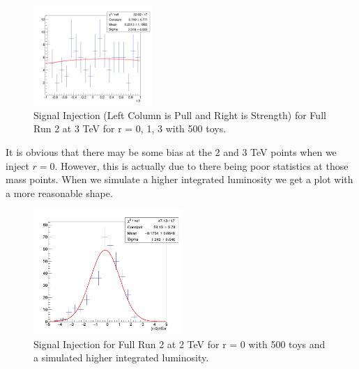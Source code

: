 \begin{figure}[!htb]
	\includegraphics[width=0.4\textwidth]{Figures/signalInjection3_500_sigstrength_3000.png}
	\caption{Signal Injection (Left Column is Pull and Right is Strength) for Full Run 2 at 3 TeV for r = 0, 1, 3 with 500 toys.}
	\label{fig:signalInjection3000plot}
\end{figure}
It is obvious that there may be some bias at the 2 and 3 TeV points when we inject $r = 0$. However, this is actually due to there being poor statistics at those mass points. When we simulate a higher integrated luminosity we get a plot with a more reasonable shape.
\begin{figure}[!htb]
	\centering
	\includegraphics[width=0.5\textwidth]{Figures/signalInjection0_500_sigpull_2000_HIGHYIELD.png}
	\caption{Signal Injection for Full Run 2 at 2 TeV for r = 0 with 500 toys and a simulated higher integrated luminosity.}
	\label{fig:signalInjection2000plotHIGH}
\end{figure}
\clearpage
